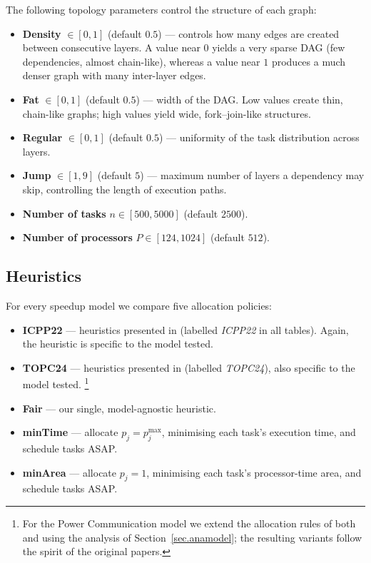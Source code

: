 \documentclass{article}
\begin{document}
The following topology parameters control the structure of each graph:
\begin{itemize}
    \item \textbf{Density} $\in[0,1]$ (default $0.5$) — controls how many edges are created between consecutive layers.
          A value near $0$ yields a very sparse DAG (few dependencies,
          almost chain-like), whereas a value near $1$ produces a much denser
          graph with many inter-layer edges.
    \item \textbf{Fat} $\in[0,1]$ (default $0.5$) — width of the DAG.
          Low values create thin, chain-like graphs; high values yield
          wide, fork–join-like structures.
    \item \textbf{Regular} $\in[0,1]$ (default $0.5$) — uniformity of the task
          distribution across layers.
    \item \textbf{Jump} $\in[1,9]$ (default $5$) — maximum number of layers a
          dependency may skip, controlling the length of execution paths.
    \item \textbf{Number of tasks} $n\in[500,5000]$ (default $2500$).
    \item \textbf{Number of processors} $P\in[124,1024]$ (default $512$).
\end{itemize}

\subsection{Heuristics}
\label{sec:heuristics2}

For every speedup model we compare five allocation policies:
\begin{itemize}
    \item \textbf{ICPP22} — heuristics presented in
          \cite{ICPP22} (labelled \emph{ICPP22} in all tables). Again, the heuristic is specific to the model tested.
    \item \textbf{TOPC24} — heuristics presented in
          \cite{TOPC24} (labelled \emph{TOPC24}), also specific to the model tested.
          \footnote{For the Power Communication model we extend the
          allocation rules of both \cite{ICPP22} and \cite{TOPC24} using the
          analysis of Section~\ref{sec.anamodel}; the resulting variants follow
          the spirit of the original papers.}
    \item \textbf{Fair} — our single, model-agnostic heuristic.
    \item \textbf{minTime} — allocate \(p_j=p_j^{\max}\), minimising each
          task’s execution time, and schedule tasks ASAP.
    \item \textbf{minArea} — allocate \(p_j=1\), minimising each
          task’s processor-time area, and schedule tasks ASAP.
\end{itemize}
\end{document}

